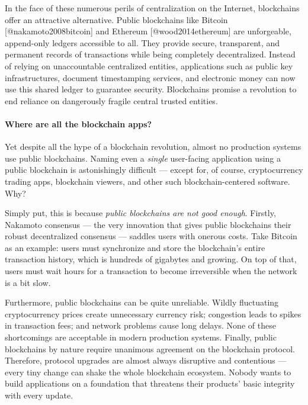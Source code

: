 \documentclass[]{article}
\let\oldparagraph\paragraph
\renewcommand{\paragraph}[1]{\oldparagraph{#1}\mbox{}}
\begin{document}
In the face of these numerous perils of centralization on the Internet,
blockchains offer an attractive alternative. Public blockchains like
Bitcoin {[}@nakamoto2008bitcoin{]} and Ethereum {[}@wood2014ethereum{]}
are unforgeable, append-only ledgers accessible to all. They provide
secure, transparent, and permanent records of transactions while being
completely decentralized. Instead of relying on unaccountable
centralized entities, applications such as public key infrastructures,
document timestamping services, and electronic money can now use this
shared ledger to guarantee security. Blockchains promise a revolution to
end reliance on dangerously fragile central trusted entities.

\hypertarget{where-are-all-the-blockchain-apps}{%
\paragraph{Where are all the blockchain
apps?}\label{where-are-all-the-blockchain-apps}}

Yet despite all the hype of a blockchain revolution, almost no
production systems use public blockchains. Naming even a \emph{single}
user-facing application using a public blockchain is astonishingly
difficult --- except for, of course, cryptocurrency trading apps,
blockchain viewers, and other such blockchain-centered software. Why?

Simply put, this is because \emph{public blockchains are not good
enough}. Firstly, Nakamoto consensus --- the very innovation that gives
public blockchains their robust decentralized consensus --- saddles
users with onerous costs. Take Bitcoin as an example: users must
synchronize and store the blockchain's entire transaction history, which
is hundreds of gigabytes and growing. On top of that, users must wait
hours for a transaction to become irreversible when the network is a bit
slow.

Furthermore, public blockchains can be quite unreliable. Wildly
fluctuating cryptocurrency prices create unnecessary currency risk;
congestion leads to spikes in transaction fees; and network problems
cause long delays. None of these shortcomings are acceptable in modern
production systems. Finally, public blockchains by nature require
unanimous agreement on the blockchain protocol. Therefore, protocol
upgrades are almost always disruptive and contentious --- every tiny
change can shake the whole blockchain ecosystem. Nobody wants to build
applications on a foundation that threatens their products' basic
integrity with every update.
\end{document}
